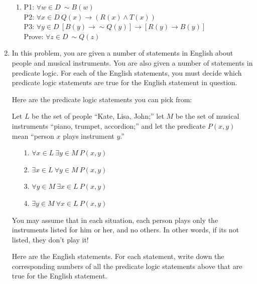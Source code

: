 \documentclass[12pt, letterpaper]{report}
\newcommand{\nott}{{\sim}}
\begin{document}
\begin{enumerate}
\begin{enumerate}
\item P1: $\forall w \in D \ \nott B(w)$ \\
        P2: $\forall x \in D \ Q(x) \to (R(x) \land T(x))$ \\
        P3: $\forall y \in D \ [B(y) \to \nott Q(y)] \to [R(y) \to B(y)]$ \\
        Prove: $\forall z \in D \ \nott Q(z)$

\end{enumerate}

\newpage

\item In this problem, you are given a number of statements in English about people and musical instruments.
You are also given a number of statements in predicate logic.  For each of the English statements, you must
decide which predicate logic statements are true for the English statement in question.

Here are the predicate logic statements you can pick from:

Let $L$ be the set of people ``Kate, Lisa, John;'' let $M$ be the set of musical instruments ``piano, trumpet, accordion;'' and 
let the predicate $P(x,y)$ mean ``person $x$ plays instrument $y$.''

\begin{enumerate}
        \item[1.]  $\forall x \in L \ \exists y \in M \ P(x, y)$
        \item[2.]  $\exists x \in L \ \forall y \in M \ P(x, y)$
        \item[3.]  $\forall y \in M \ \exists x \in L \ P(x, y)$
        \item[4.]  $\exists y \in M \ \forall x \in L \ P(x, y)$
\end{enumerate}

You may assume that in each situation, each person plays only the instruments listed for him or her, and no others. In other words, if its not listed, they don't play it!

Here are the English statements.  For each statement, write down the corresponding numbers of all the predicate logic statements above that are true for the
English statement.


\end{enumerate}
\end{document}
